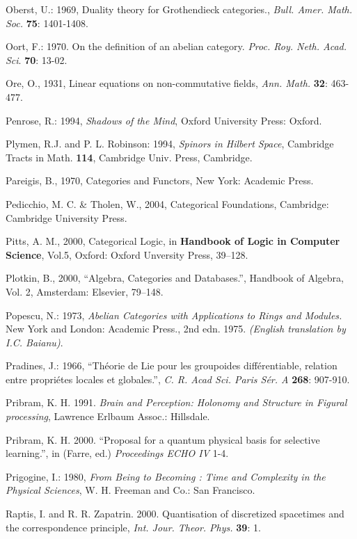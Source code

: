 \documentclass[12pt]{article}
\theoremstyle{plain}
\theoremstyle{definition}
\numberwithin{equation}{section}
\begin{document}
\begin{thebibliography}{99}
Oberst, U.: 1969, Duality theory for Grothendieck categories., \emph{Bull. Amer. Math. Soc.} \textbf{75}: 1401-1408.

Oort, F.: 1970. On the definition of an abelian category. \emph{Proc. Roy. Neth. Acad. Sci}. \textbf{70}: 13-02.

Ore, O., 1931, Linear equations on non-commutative fields, {\em Ann. Math.}
\textbf{32}: 463-477.

Penrose, R.: 1994, \emph{Shadows of the Mind}, Oxford University
Press: Oxford.

Plymen, R.J. and P. L. Robinson: 1994,  \emph{Spinors in Hilbert Space}, Cambridge Tracts in Math. 
\textbf{114}, Cambridge Univ. Press, Cambridge.

Pareigis, B., 1970, Categories and Functors, New York: Academic Press. 

Pedicchio, M. C. \& Tholen, W., 2004, Categorical Foundations, Cambridge: Cambridge University Press. 

Pitts, A. M., 2000, Categorical Logic, in \textbf{Handbook of Logic in Computer Science}, Vol.5, Oxford: Oxford Unversity Press, 39--128.

Plotkin, B., 2000, ``Algebra, Categories and Databases.'', Handbook of Algebra, Vol. 2, Amsterdam: Elsevier, 79--148. 

Popescu, N.: 1973, \emph{Abelian Categories with Applications to Rings and Modules.} New York and London: Academic Press., 2nd edn. 1975. \emph{(English translation by I.C. Baianu)}.

Pradines, J.: 1966, ``Th\'eorie de Lie pour les groupoides diff\'erentiable, relation entre propri\'etes locales et globales.'', \emph{C. R. Acad Sci. Paris S\'er. A} \textbf{268}: 907-910.

Pribram, K. H. 1991. \emph{Brain and Perception: Holonomy and Structure in Figural processing}, Lawrence Erlbaum Assoc.: Hillsdale.

Pribram, K. H. 2000. ``Proposal for a quantum physical basis for selective learning.'', in (Farre, ed.)
\emph{Proceedings ECHO IV} 1-4.

Prigogine, I.: 1980, \emph{From Being to Becoming : Time and Complexity in the Physical Sciences}, 
W. H. Freeman and Co.: San Francisco.

Raptis, I. and R. R. Zapatrin. 2000. Quantisation of discretized spacetimes and the correspondence principle, \emph{Int. Jour. Theor. Phys.} \textbf{39}: 1.


\end{thebibliography}
\end{document}

